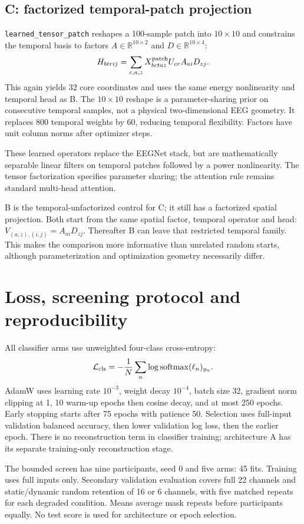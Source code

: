\documentclass[11pt,a4paper]{article}
\newcommand{\code}[1]{{\small\nolinkurl{#1}}}
\begin{document}
\subsection{C: factorized temporal-patch projection}
\code{learned_tensor_patch} reshapes a 100-sample patch into $10\times10$ and
constrains the temporal basis to factors $A\in\mathbb{R}^{10\times2}$ and
$D\in\mathbb{R}^{10\times4}$:
\[
 H_{btrij}=\sum_{c,a,z}X^{\rm patch}_{bctaz}U_{cr}A_{ai}D_{zj}.
\]
This again yields 32 core coordinates and uses the same energy nonlinearity
and temporal head as B. The $10\times10$ reshape is a parameter-sharing prior
on consecutive temporal samples, not a physical two-dimensional EEG geometry.
It replaces 800 temporal weights by 60, reducing temporal flexibility.
Factors have unit column norms after optimizer steps.

These learned operators replace the EEGNet stack, but are mathematically
separable linear filters on temporal patches followed by a power nonlinearity.
The tensor factorization specifies parameter sharing; the attention rule remains
standard multi-head attention.

B is the temporal-unfactorized control for C; it still has a factorized spatial
projection. Both start from the same spatial factor, temporal operator and head:
$V_{(a,z),(i,j)}=A_{ai}D_{zj}$. Thereafter B can leave that restricted temporal
family. This makes the comparison more informative than unrelated random starts,
although parameterization and optimization geometry necessarily differ.

\section{Loss, screening protocol and reproducibility}
All classifier arms use unweighted four-class cross-entropy:
\[
 \mathcal{L}_{\rm cls}=-\frac1N\sum_n
 \log\operatorname{softmax}(\ell_n)_{y_n}.
\]
AdamW uses learning rate $10^{-3}$, weight decay $10^{-4}$, batch size 32,
gradient norm clipping at 1, 10 warm-up epochs then cosine decay, and at most
250 epochs. Early stopping starts after 75 epochs with patience 50.
Selection uses full-input validation balanced accuracy, then lower validation
log loss, then the earlier epoch. There is no reconstruction term in classifier
training; architecture A has its separate training-only reconstruction stage.

The bounded screen has nine participants, seed 0 and five arms: 45 fits.
Training uses full inputs only. Secondary validation evaluation covers full
22 channels and static/dynamic random retention of 16 or 6 channels, with five
matched repeats for each degraded condition. Means average mask repeats before
participants equally. No test score is used for architecture or epoch selection.
\end{document}
